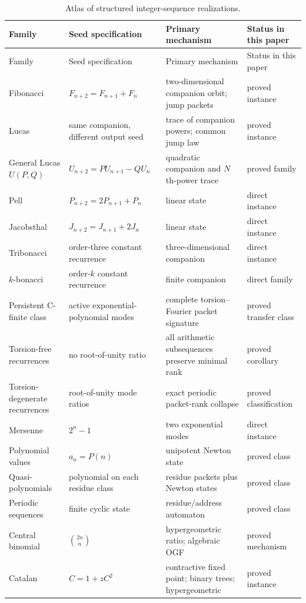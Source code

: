 \documentclass[11pt]{article}
\theoremstyle{definition}\newtheorem{definition}[theorem]{Definition}\newtheorem{example}[theorem]{Example}\newtheorem{construction}[theorem]{Construction}\newtheorem{algorithm}[theorem]{Algorithm}\newtheorem{conjecture}[theorem]{Conjecture}\newtheorem{problem}[theorem]{Problem}
\theoremstyle{remark}\newtheorem{remark}[theorem]{Remark}\newtheorem{boundary}[theorem]{Boundary}\newtheorem{certificate}[theorem]{Computational Certificate}\newtheorem{classical}[theorem]{Classical Input}\newtheorem{principle}[theorem]{Structural Principle}
\begin{document}
\small
\begin{longtable}{L{.15\textwidth}L{.20\textwidth}L{.28\textwidth}L{.18\textwidth}}
\caption{Atlas of structured integer-sequence realizations.}\label{tab:atlas}\\
\toprule
Family&Seed specification&Primary mechanism&Status in this paper\\
\midrule
\endfirsthead
\toprule
Family&Seed specification&Primary mechanism&Status in this paper\\
\midrule
\endhead
Fibonacci&$F_{n+2}=F_{n+1}+F_n$&two-dimensional companion orbit; jump packets&proved instance\\
Lucas&same companion, different output seed&trace of companion powers; common jump law&proved instance\\
General Lucas $U(P,Q)$&$U_{n+2}=PU_{n+1}-QU_n$&quadratic companion and $N$th-power trace&proved family\\
Pell&$P_{n+2}=2P_{n+1}+P_n$&linear state&direct instance\\
Jacobsthal&$J_{n+2}=J_{n+1}+2J_n$&linear state&direct instance\\
Tribonacci&order-three constant recurrence&three-dimensional companion&direct instance\\
$k$-bonacci&order-$k$ constant recurrence&finite companion&direct family\\
Persistent C-finite class&active exponential-polynomial modes&complete torsion--Fourier packet signature&proved transfer class\\
Torsion-free recurrences&no root-of-unity ratio&all arithmetic subsequences preserve minimal rank&proved corollary\\
Torsion-degenerate recurrences&root-of-unity mode ratios&exact periodic packet-rank collapse&proved classification\\
Mersenne&$2^n-1$&two exponential modes&direct instance\\
Polynomial values&$a_n=P(n)$&unipotent Newton state&proved class\\
Quasi-polynomials&polynomial on each residue class&residue packets plus Newton states&proved class\\
Periodic sequences&finite cyclic state&residue/address automaton&proved class\\
Central binomial&$\binom{2n}{n}$&hypergeometric ratio; algebraic OGF&proved mechanism\\
Catalan&$C=1+zC^2$&contractive fixed point; binary trees; hypergeometric&proved instance\\

\end{longtable}
\end{document}
